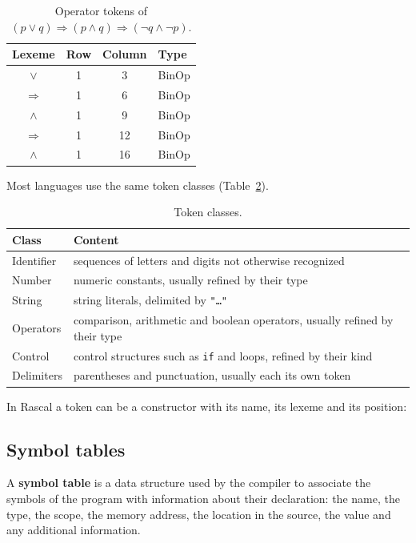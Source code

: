 \begin{table}[h]
\centering
\small
\begin{tabular}{c c c l}
  \toprule
  Lexeme & Row & Column & Type \\
  \midrule
  $\vee$        & 1 & 3  & BinOp \\
  $\Rightarrow$ & 1 & 6  & BinOp \\
  $\wedge$      & 1 & 9  & BinOp \\
  $\Rightarrow$ & 1 & 12 & BinOp \\
  $\wedge$      & 1 & 16 & BinOp \\
  \bottomrule
\end{tabular}
\caption{Operator tokens of $(p{\vee}q){\Rightarrow}(p{\wedge}q){\Rightarrow}(\neg q{\wedge}\neg p)$.}
\label{tab:wff-tokens}
\end{table}

Most languages use the same token classes (Table~\ref{tab:token-classes}).

\begin{table}[h]
\centering
\small
\begin{tabular}{l p{}}
  \toprule
  Class & Content \\
  \midrule
  Identifier & sequences of letters and digits not otherwise recognized \\
  Number     & numeric constants, usually refined by their type \\
  String     & string literals, delimited by \texttt{"\dots"} \\
  Operators  & comparison, arithmetic and boolean operators, usually refined by their type \\
  Control    & control structures such as \texttt{if} and loops, refined by their kind \\
  Delimiters & parentheses and punctuation, usually each its own token \\
  \bottomrule
\end{tabular}
\caption{Token classes.}
\label{tab:token-classes}
\end{table}

In Rascal a token can be a constructor with its name, its lexeme and its
position:

\subsection{Symbol tables}

\begin{definition}
A \textbf{symbol table} is a data structure used by the compiler to associate
the symbols of the program with information about their declaration: the
name, the type, the scope, the memory address, the location in the source,
the value and any additional information.
\end{definition}

